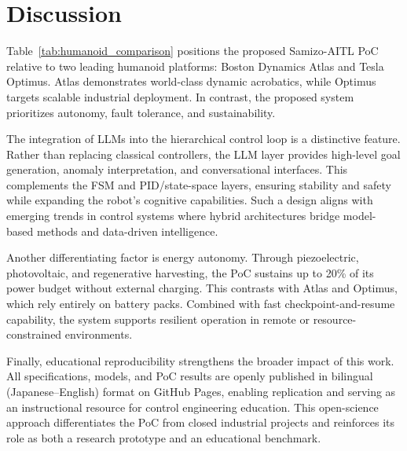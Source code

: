 \section{Discussion}
Table~\ref{tab:humanoid_comparison} positions the proposed Samizo-AITL PoC
relative to two leading humanoid platforms: Boston Dynamics Atlas and Tesla Optimus.
Atlas demonstrates world-class dynamic acrobatics, while Optimus targets scalable
industrial deployment. In contrast, the proposed system prioritizes autonomy,
fault tolerance, and sustainability.

The integration of LLMs into the hierarchical control loop is a distinctive feature.
Rather than replacing classical controllers, the LLM layer provides high-level
goal generation, anomaly interpretation, and conversational interfaces.
This complements the FSM and PID/state-space layers, ensuring stability and safety
while expanding the robot’s cognitive capabilities.
Such a design aligns with emerging trends in control systems where hybrid
architectures bridge model-based methods and data-driven intelligence.

Another differentiating factor is energy autonomy.
Through piezoelectric, photovoltaic, and regenerative harvesting,
the PoC sustains up to 20\% of its power budget without external charging.
This contrasts with Atlas and Optimus, which rely entirely on battery packs.
Combined with fast checkpoint-and-resume capability, the system supports resilient
operation in remote or resource-constrained environments.

Finally, educational reproducibility strengthens the broader impact of this work.
All specifications, models, and PoC results are openly published in bilingual
(Japanese–English) format on GitHub Pages, enabling replication and serving
as an instructional resource for control engineering education.
This open-science approach differentiates the PoC from closed industrial projects
and reinforces its role as both a research prototype and an educational benchmark.
